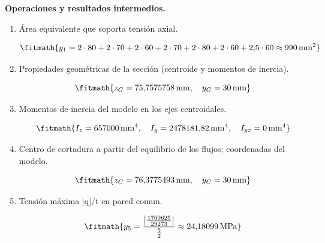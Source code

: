 \noindent\textbf{Operaciones y resultados intermedios.}

\begin{enumerate}

\item Área equivalente que soporta tensión axial.

\[\fitmath{y_{1}=2\cdot 80+2\cdot 70+2\cdot 60+2\cdot 70+2\cdot 80+2\cdot 60+2{,}5\cdot 60\approx 990\,\mathrm{mm^{2}}}\]

\item Propiedades geométricas de la sección (centroide y momentos de inercia).

\[\fitmath{z_G=75{,}7575758\,\mathrm{mm},\quad y_G=30\,\mathrm{mm}}\]

\item Momentos de inercia del modelo en los ejes centroidales.

\[\fitmath{I_z=657000\,\mathrm{mm}^{4},\quad I_y=2478181{,}82\,\mathrm{mm}^{4},\quad I_{yz}=0\,\mathrm{mm}^{4}}\]

\item Centro de cortadura a partir del equilibrio de los flujos; coordenadas del modelo.

\[\fitmath{z_C=76{,}3775493\,\mathrm{mm},\quad y_C=30\,\mathrm{mm}}\]

\item Tensión máxima |q|/t en pared comun.

\[\fitmath{y_{5}=\frac{\left|\frac{1769625}{29273}\right|}{\frac{5}{2}}\approx 24{,}18099\,\mathrm{MPa}}\]

\end{enumerate}
